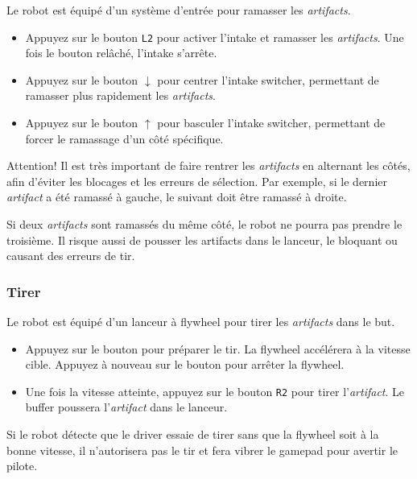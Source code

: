 \documentclass[12pt, a4paper]{report}
\begin{document}
    Le robot est équipé d'un système d'entrée pour ramasser les \textit{artifacts}.
    \begin{itemize}
        \item Appuyez sur le bouton \texttt{L2} pour activer l'intake et ramasser les \textit{artifacts}. Une fois le bouton relâché, l'intake s'arrête.
        \item Appuyez sur le bouton \texttt{$\downarrow$} pour centrer l'intake switcher, permettant de ramasser plus rapidement les \textit{artifacts}.
        \item Appuyez sur le bouton \texttt{$\uparrow$} pour basculer l'intake switcher, permettant de forcer le ramassage d'un côté spécifique.
    \end{itemize}

    \begin{myinfo}{Attention!}
        Il est très important de faire rentrer les \textit{artifacts} en alternant les côtés, afin d'éviter les blocages et les erreurs de sélection.
        Par exemple, si le dernier \textit{artifact} a été ramassé à gauche, le suivant doit être ramassé à droite.

        Si deux \textit{artifacts} sont ramassés du même côté, le robot ne pourra pas prendre le troisième. Il risque aussi de pousser les artifacts dans le lanceur, le bloquant ou causant des erreurs de tir.
    \end{myinfo}

    \subsubsection{Tirer}

    Le robot est équipé d'un lanceur à flywheel pour tirer les \textit{artifacts} dans le but.

    \begin{itemize}
        \item Appuyez sur le bouton \textttt{$\square$} pour préparer le tir. La flywheel accélérera à la vitesse cible. Appuyez à nouveau sur le bouton pour arrêter la flywheel.
        \item Une fois la vitesse atteinte, appuyez sur le bouton \texttt{R2} pour tirer l'\textit{artifact}. Le buffer poussera l'\textit{artifact} dans le lanceur.
    \end{itemize}

    Si le robot détecte que le driver essaie de tirer sans que la flywheel soit à la bonne vitesse, il n'autorisera pas le tir et fera vibrer le gamepad pour avertir le pilote.
\end{document}

